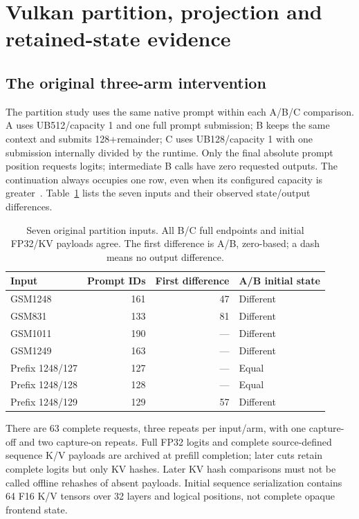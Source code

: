 \section{Vulkan partition, projection and retained-state evidence}
\label{supp:b570}
\subsection{The original three-arm intervention}
The partition study uses the same native prompt within each A/B/C comparison. A uses UB512/capacity 1 and one full prompt submission; B keeps the same context and submits 128+remainder; C uses UB128/capacity 1 with one submission internally divided by the runtime. Only the final absolute prompt position requests logits; intermediate B calls have zero requested outputs. The continuation always occupies one row, even when its configured capacity is greater~\cite{bpartition}. Table~\ref{tab:partitioninputs} lists the seven inputs and their observed state/output differences.

\begin{table}[t]\centering\small
\caption{Seven original partition inputs. All B/C full endpoints and initial FP32/KV payloads agree. The first difference is A/B, zero-based; a dash means no output difference.}\label{tab:partitioninputs}
\begin{tabular}{@{}lrrl@{}}\toprule
Input&Prompt IDs&First difference&A/B initial state\\\midrule
GSM1248&161&47&Different\\
GSM831&133&81&Different\\
GSM1011&190&---&Different\\
GSM1249&163&---&Different\\\addlinespace[2pt]
Prefix 1248/127&127&---&Equal\\
Prefix 1248/128&128&---&Equal\\
Prefix 1248/129&129&57&Different\\\bottomrule
\end{tabular}
\end{table}

There are 63 complete requests, three repeats per input/arm, with one capture-off and two capture-on repeats. Full FP32 logits and complete source-defined sequence K/V payloads are archived at prefill completion; later cuts retain complete logits but only KV hashes. Later KV hash comparisons must not be called offline rehashes of absent payloads. Initial sequence serialization contains 64 F16 K/V tensors over 32 layers and logical positions, not complete opaque frontend state.

